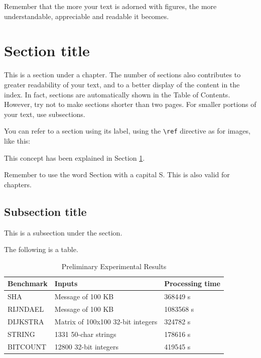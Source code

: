 Remember that the more your text is adorned with figures, the more understandable, appreciable and readable it becomes.

\section{Section title}\label{examplesection}
This is a section under a chapter. The number of sections also contributes to greater readability of your text, and to a better display of the content in the index. In fact, sections are automatically shown in the Table of Contents. However, try not to make sections shorter than two pages. For smaller portions of your text, use subsections.

You can refer to a section using its label, using the \lstinline{\ref} directive as for images, like this:

\begin{center}
	This concept has been explained in Section \ref{examplesection}.
\end{center}

Remember to use the word Section with a capital S. This is also valid for chapters.

\subsection{Subsection title}
This is a subsection under the section.

The following is a table.

\begin{table}
	\centering
	\caption{Preliminary Experimental Results}
	\begin{tabular}{| p{3cm} | p{3cm} | p{3cm} |}
		\hline
		\textbf{Benchmark} & \textbf{Inputs}                   & \textbf{Processing time} \\ \hline
		SHA                & Message of 100 KB                 & 368449 s                 \\ \hline
		RIJNDAEL           & Message of 100 KB                 & 1083568 s                \\ \hline
		DIJKSTRA           & Matrix of 100x100 32-bit integers & 324782 s                 \\ \hline
		STRING             & 1331 50-char strings              & 178616 s                 \\ \hline
		BITCOUNT           & 12800 32-bit integers             & 419545 s                 \\ \hline
		\hline
	\end{tabular}
	\label{tab:ar}
\end{table}

